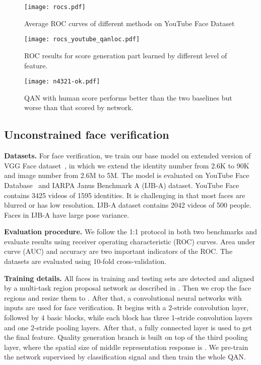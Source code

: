 \documentclass[10pt,twocolumn,letterpaper]{article}
\begin{document}
\begin{figure*}[!htb]
\center
  \texttt{[image: rocs.pdf]}
  \caption{Average ROC curves of different methods on YouTube Face Dataset}
  \label{fig:rocs}
\endminipage\hfill
{}\center
  \texttt{[image: rocs\_youtube\_qanloc.pdf]}
  \caption{ROC results for score generation part learned by different level of feature.}
  \label{fig:qanloc}
\endminipage
{}
\centering
  \texttt{[image: n4321-ok.pdf]}
  \caption{QAN with human score performs better than the two baselines but worse than that scored by network.\label{fig:roc4321}}
\endminipage


\end{figure*}

\subsection{Unconstrained face verification}
\textbf{Datasets.} For face verification, we train our base model on extended version of VGG Face dataset~\cite{Parkhi15}, in which we extend the identity number from 2.6K to 90K and image number from 2.6M to 5M. The model is evaluated on YouTube Face Database~\cite{wolf2011face} and IARPA Janus Benchmark A (IJB-A) dataset. YouTube Face contains 3425 videos of 1595 identities. It is challenging in that most faces are blurred or has low resolution. IJB-A dataset contains 2042 videos of 500 people. Faces in IJB-A have large pose variance.

\textbf{Evaluation procedure.} We follow the 1:1 protocol in both two benchmarks and evaluate results using receiver operating characteristic (ROC) curves. Area under curve (AUC) and accuracy are two important indicators of the ROC. The datasets are evaluated using 10-fold cross-validation.

\textbf{Training details.}
All faces in training and testing sets are detected and aligned by a multi-task region proposal network as described in \cite{chen2016supervised}. Then we crop the face regions and resize them to . After that, a convolutional neural networks with  inputs are used for face verification. It begins with a 2-stride convolution layer, followed by 4 basic blocks, while each block has three 1-stride convolution layers and one 2-stride pooling layers. After that, a fully connected layer is used to get the final feature. Quality generation branch is built on top of the third pooling layer, where the spatial size of middle representation response is . We pre-train the network supervised by classification signal and then train the whole QAN.
\end{document}
